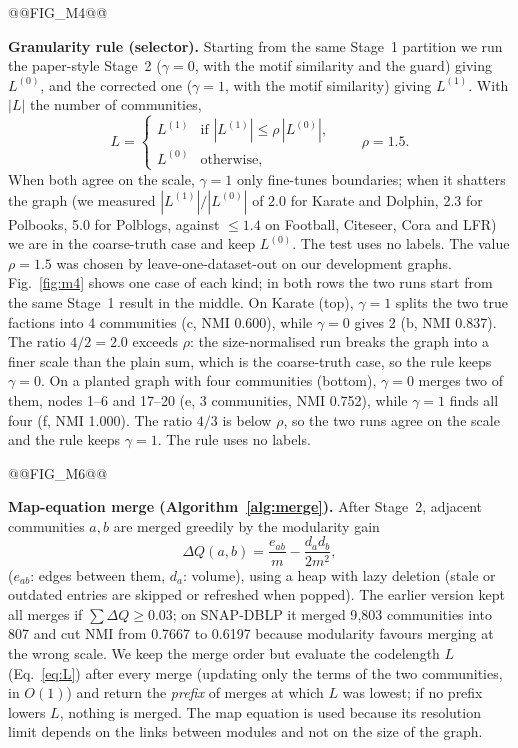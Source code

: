 \documentclass[conference]{IEEEtran}
\begin{document}
@@FIG_M4@@

\textbf{Granularity rule (selector).} Starting from the same Stage~1 partition we run the paper-style Stage~2 ($\gamma=0$, with the motif similarity and the guard) giving $L^{(0)}$, and the corrected one ($\gamma=1$, with the motif similarity) giving $L^{(1)}$. With $|L|$ the number of communities,
\begin{equation}
L=\begin{cases}L^{(1)}&\text{if }|L^{(1)}|\le\rho\,|L^{(0)}|,\\ L^{(0)}&\text{otherwise,}\end{cases}\qquad\rho=1.5.\label{eq:gran}
\end{equation}
When both agree on the scale, $\gamma=1$ only fine-tunes boundaries; when it shatters the graph (we measured $|L^{(1)}|/|L^{(0)}|$ of 2.0 for Karate and Dolphin, 2.3 for Polbooks, 5.0 for Polblogs, against $\le1.4$ on Football, Citeseer, Cora and LFR) we are in the coarse-truth case and keep $L^{(0)}$. The test uses no labels. The value $\rho=1.5$ was chosen by leave-one-dataset-out on our development graphs. Fig.~\ref{fig:m4} shows one case of each kind; in both rows the two runs start from the same Stage~1 result in the middle. On Karate (top), $\gamma=1$ splits the two true factions into 4 communities (c, NMI 0.600), while $\gamma=0$ gives 2 (b, NMI 0.837). The ratio $4/2=2.0$ exceeds $\rho$: the size-normalised run breaks the graph into a finer scale than the plain sum, which is the coarse-truth case, so the rule keeps $\gamma=0$. On a planted graph with four communities (bottom), $\gamma=0$ merges two of them, nodes 1--6 and 17--20 (e, 3 communities, NMI 0.752), while $\gamma=1$ finds all four (f, NMI 1.000). The ratio $4/3$ is below $\rho$, so the two runs agree on the scale and the rule keeps $\gamma=1$. The rule uses no labels.

@@FIG_M6@@

\textbf{Map-equation merge (Algorithm~\ref{alg:merge}).} After Stage~2, adjacent communities $a,b$ are merged greedily by the modularity gain
\begin{equation}
\Delta Q(a,b)=\frac{e_{ab}}{m}-\frac{d_ad_b}{2m^2},\label{eq:dq}
\end{equation}
($e_{ab}$: edges between them, $d_a$: volume), using a heap with lazy deletion (stale or outdated entries are skipped or refreshed when popped). The earlier version kept all merges if $\sum\Delta Q\ge0.03$; on SNAP-DBLP it merged 9{,}803 communities into 807 and cut NMI from 0.7667 to 0.6197 because modularity favours merging at the wrong scale. We keep the merge order but evaluate the codelength $L$ (Eq.~\eqref{eq:L}) after every merge (updating only the terms of the two communities, in $O(1)$) and return the \emph{prefix} of merges at which $L$ was lowest; if no prefix lowers $L$, nothing is merged. The map equation is used because its resolution limit depends on the links between modules and not on the size of the graph.
\end{document}

